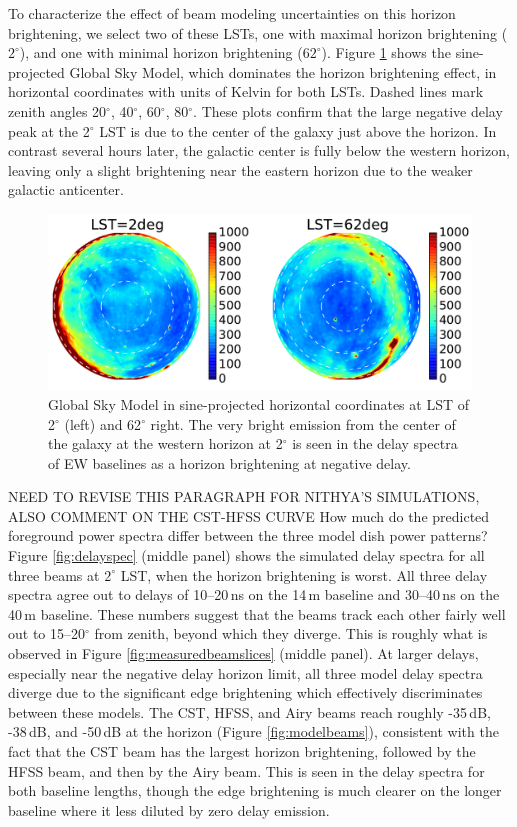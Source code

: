 \documentclass{emulateapj}
\begin{document}
To characterize the effect of beam modeling uncertainties on this horizon brightening, we select two of these LSTs, one with maximal horizon brightening ($2^\circ$), and one with minimal horizon brightening ($62^\circ$). Figure \ref{fig:gsmplots} shows the sine-projected Global Sky Model, which dominates the horizon brightening effect, in horizontal coordinates with units of Kelvin for both LSTs. Dashed lines mark zenith angles 20$^\circ$, 40$^\circ$, 60$^\circ$, 80$^\circ$. These plots confirm that the large negative delay peak at the 2$^\circ$ LST is due to the center of the galaxy just above the horizon. In contrast several hours later, the galactic center is fully below the western horizon, leaving only a slight brightening near the eastern horizon due to the weaker galactic anticenter. 

\begin{figure}[h]
\centering
\includegraphics[width=6in]{gsm_kelvin_LST_2deg_and_62deg.pdf}
\caption{Global Sky Model \citep{gsm} in sine-projected horizontal coordinates at LST of 2$^\circ$ (left) and 62$^\circ$ right. The very bright emission from the center of the galaxy at the western horizon at 2$^\circ$ is seen in the delay spectra of EW baselines as a horizon brightening at negative delay.}
\label{fig:gsmplots}
\end{figure}

NEED TO REVISE THIS PARAGRAPH FOR NITHYA'S SIMULATIONS, ALSO COMMENT ON THE CST-HFSS CURVE
How much do the predicted foreground power spectra differ between the three model dish power patterns? Figure \ref{fig:delayspec} (middle panel) shows the simulated delay spectra for all three beams at $2^\circ$ LST, when the horizon brightening is worst. All three delay spectra agree out to delays of 10--20\,ns on the 14\,m baseline and 30--40\,ns on the 40\,m baseline. These numbers suggest that the beams track each other fairly well out to 15--20$^\circ$ from zenith, beyond which they diverge. This is roughly what is observed in Figure \ref{fig:measuredbeamslices} (middle panel). At larger delays, especially near the negative delay horizon limit, all three model delay spectra diverge due to the significant edge brightening which effectively discriminates between these models. The CST, HFSS, and Airy beams reach roughly -35\,dB, -38\,dB, and -50\,dB at the horizon (Figure \ref{fig:modelbeams}), consistent with the fact that the CST beam has the largest horizon brightening, followed by the HFSS beam, and then by the Airy beam. This is seen in the delay spectra for both baseline lengths, though the edge brightening is much clearer on the longer baseline where it less diluted by zero delay emission.  
\end{document}

